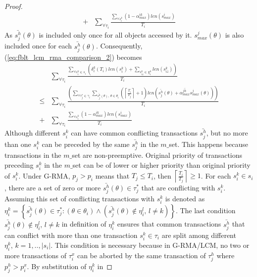\documentclass[12pt,english]{report}
\newtheorem{proof}{Proof}
\begin{document}
\begin{proof}
\begin{eqnarray}
+ & \sum_{\forall\tau_{i}}\frac{\sum_{\forall s_{i}^{k}}\left(1-\alpha_{max}^{ik}\right)len(s_{max}^{i})}{T_{i}}\nonumber 
\end{eqnarray}
As $\bar{s_{j}^{h}}(\theta)$ is included only once for all objects
accessed by it. $s_{max}^{j}(\theta)$ is also included once for each
$\bar{s_{j}^{h}}(\theta)$. Consequently, (\ref{eq:fblt_lcm_rma_comparison_2})
becomes 
\begin{eqnarray}
 & \sum_{\forall\tau_{i}}\frac{\sum_{\forall s_{i}^{k}\in s_{i}}\left(\delta_{i}^{k}(T_{i})len(s_{i}^{k})+\sum_{s_{iz}^{k}\in\chi_{i}^{k}}len(s_{iz}^{k})\right)}{T_{i}}\label{eq:fblt_lcm_rma_comparison_3}\\
\le & \sum_{\forall\tau_{i}}\frac{\left(\sum_{\forall\tau_{j}^{*}\in\gamma_{i}}\sum_{\bar{s_{j}^{h}}(\theta),\,\theta\in\theta_{i}}\left(\left\lceil \frac{T_{i}}{T_{j}}\right\rceil +1\right)len\left(\bar{s_{j}^{h}}(\theta)+\bar{\alpha_{max}^{jh}}s_{max}^{j}(\theta)\right)\right)}{T_{i}}\nonumber \\
+ & \sum_{\forall\tau_{i}}\frac{\sum_{\forall s_{i}^{k}}\left(1-\alpha_{max}^{ik}\right)len(s_{max}^{i})}{T_{i}}\nonumber 
\end{eqnarray}
Although different $s_{i}^{k}$ can have common conflicting transactions
$\bar{s_{j}^{h}}$, but no more than one $s_{i}^{k}$ can be preceded
by the same $\bar{s_{j}^{h}}$ in the $m\_$set. This happens because
transactions in the $m\_$set are non-preemptive. Original priority
of transactions preceding $s_{i}^{k}$ in the $m\_$set can be of
lower or higher priority than original priority of $s_{i}^{k}$. Under
G-RMA, $p_{j}>p_{i}$ means that $T_{j}\le T_{i}$, then $\left\lceil \frac{T_{i}}{T_{j}}\right\rceil \ge1$.
For each $s_{i}^{k}\in s_{i}$, there are a set of zero or more $\bar{s_{j}^{h}}(\theta)\in\tau_{j}^{*}$
that are conflicting with $s_{i}^{k}$. Assuming this set of conflicting
transactions with $s_{i}^{k}$ is denoted as $\eta_{i}^{k}=\left\{ \bar{s_{j}^{h}}(\theta)\in\tau_{j}^{*}:\left(\theta\in\theta_{i}\right)\wedge\left(\bar{s_{j}^{h}}(\theta)\not\in\eta_{i}^{l},\, l\ne k\right)\right\} $.
The last condition $\bar{s_{j}^{h}}(\theta)\not\in\eta_{i}^{l},\, l\ne k$
in definition of $\eta_{i}^{k}$ ensures that common transactions
$\bar{s_{j}^{h}}$ that can conflict with more than one transaction
$s_{i}^{k}\in\tau_{i}$ are split among different $\eta_{i}^{k},\, k=1,..,|s_{i}|$.
This condition is necessary because in G-RMA/LCM, no two or more transactions
of $\tau_{i}^{x}$ can be aborted by the same transaction of $\tau_{j}^{h}$
where $p_{j}^{h}>p_{i}^{x}$. By substitution of $\eta_{i}^{k}$ in

\end{proof}
\end{document}
